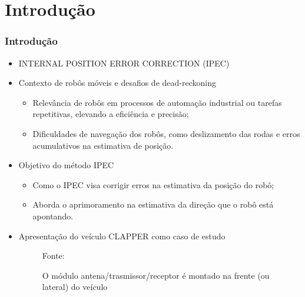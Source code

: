 \documentclass[xcolor=dvipsnames, aspectratio=169]{beamer}
\begin{document}
\section{Introdução}
\begin{frame}
  \frametitle{Introdução}
  \begin{itemize}
    \item INTERNAL POSITION ERROR CORRECTION (IPEC)
    \item Contexto de robôs móveis e desafios de dead-reckoning
      \begin{itemize}
        \item Relevância de robôs em processos de automação industrial ou tarefas repetitivas, elevando a eficiência e precisão;
        \item Dificuldades de navegação dos robôs, como deslizamento das rodas e erros acumulativos na estimativa de posição.
      \end{itemize}
    \item Objetivo do método IPEC
      \begin{itemize}
        \item Como o IPEC visa corrigir erros na estimativa da posição do robô;
        \item Aborda o aprimoramento na estimativa da direção que o robô está apontando.
      \end{itemize}
    \item Apresentação do veículo CLAPPER como caso de estudo
    \newpage
    \begin{figure}
      \centering
      {Fonte: \cite{borenstein1995intemal}}
      \caption{O módulo antena/trasmissor/receptor é montado na frente (ou lateral) do veículo}
      \label{fig:curva_de_freq}
    \end{figure} 
  \end{itemize}
\end{frame}
\end{document}
